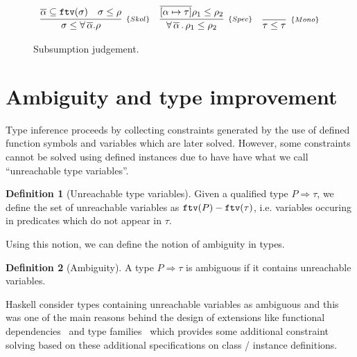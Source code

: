 \documentclass[a4paper, 11pt]{article}
\theoremstyle{definition}
\newtheorem{Definition}{Definition}
\begin{document}
\begin{figure}[H]
\[
  \begin{array}{ccc}
    \infer[_{\{Skol\}}]
          {\sigma \leq \forall\,\overline{\alpha}.\rho}
          {\overline{\alpha}\subseteq \ftv(\sigma) &
            \sigma \leq \rho}
    &
    \infer[_{\{Spec\}}]
          {\forall\,\overline{\alpha}\,.\,\rho_1 \leq \rho_2}
          {\overline{[\alpha\mapsto\tau]}\rho_1 \leq \rho_2}
    &
    \infer[_{\{Mono\}}]
          {\tau \leq \tau}
          {}
  \end{array}
\]
  \centering
  \caption{Subsumption judgement.}
  \label{fig:subsumption}
\end{figure}





\section{Ambiguity and type improvement}

Type inference proceeds by collecting constraints generated
by the use of defined function symbols and variables which
are later solved. However, some constraints cannot be solved
using defined instances due to have have what we call
``unreachable type variables''.

\begin{Definition}[Unreachable type variables]
Given a qualified type
$P \Rightarrow \tau$, we define the set of unreachable variables
as $\mathtt{ftv}(P) - \mathtt{ftv}(\tau)$, i.e. variables occuring in predicates
which do not appear in $\tau$.
\end{Definition}

Using this notion, we can define the notion of ambiguity in
types.

\begin{Definition}[Ambiguity]
A type $P\Rightarrow \tau$ is ambiguous if it contains
unreachable variables.
\end{Definition}

Haskell consider types containing unreachable variables as
ambiguous and this was one of the main reasons behind the
design of extensions like functional dependencies~\cite{Jones2000}
and type families~\cite{Chakravarty2005} which provides some additional
constraint solving based on these additional specifications on
class / instance definitions.
\end{document}
